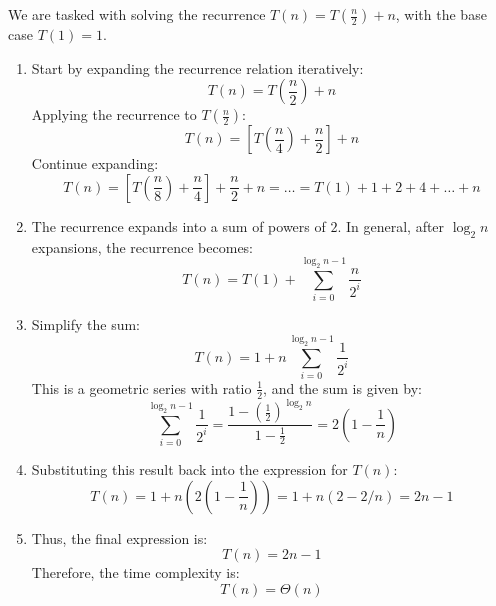\begin{example}
    We are tasked with solving the recurrence \( T(n) = T\left(\frac{n}{2}\right) + n \), with the base case \( T(1) = 1 \).

    \begin{enumerate}[label=\arabic*)]
        \item Start by expanding the recurrence relation iteratively:
        \[
        T(n) = T\left(\frac{n}{2}\right) + n
        \]
        Applying the recurrence to \( T\left(\frac{n}{2}\right) \):
        \[
        T(n) = \left[T\left(\frac{n}{4}\right) + \frac{n}{2}\right] + n
        \]
        Continue expanding:
        \[
        T(n) = \left[T\left(\frac{n}{8}\right) + \frac{n}{4}\right] + \frac{n}{2} + n = \dots = T(1) + 1 + 2 + 4 + \dots + n
        \]

        \item The recurrence expands into a sum of powers of \( 2 \). In general, after \( \log_2 n \) expansions, the recurrence becomes:
        \[
        T(n) = T(1) + \sum_{i=0}^{\log_2 n - 1} \frac{n}{2^i}
        \]
        
        \item Simplify the sum:
        \[
        T(n) = 1 + n \sum_{i=0}^{\log_2 n - 1} \frac{1}{2^i}
        \]
        This is a geometric series with ratio \( \frac{1}{2} \), and the sum is given by:
        \[
        \sum_{i=0}^{\log_2 n - 1} \frac{1}{2^i} = \frac{1 - \left(\frac{1}{2}\right)^{\log_2 n}}{1 - \frac{1}{2}} = 2 \left(1 - \frac{1}{n}\right)
        \]
        
        \item Substituting this result back into the expression for \( T(n) \):
        \[
        T(n) = 1 + n \left(2 \left(1 - \frac{1}{n}\right)\right) = 1 + n(2 - 2/n) = 2n - 1
        \]
        
        \item Thus, the final expression is:
        \[
        T(n) = 2n - 1
        \]
        Therefore, the time complexity is:
        \[
        T(n) = \Theta(n)
        \]
    \end{enumerate}
\end{example}

